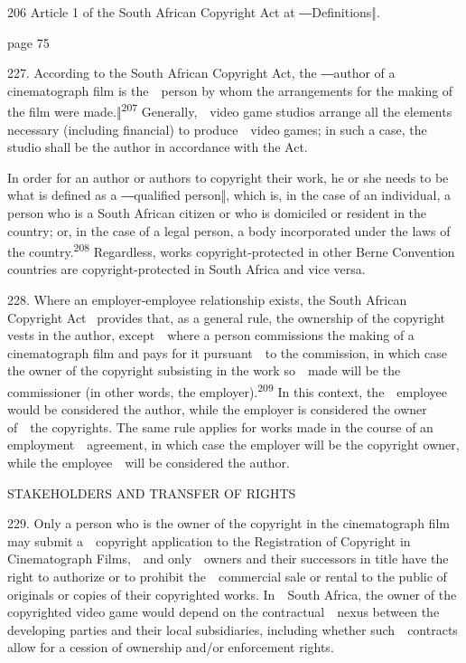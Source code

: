 \documentclass[
]{article}
\begin{document}
{206 }{Article 1 of the South African }{Copyright Act }{at
}{―}{Definitions}{‖}{.}

{page 75}

{227. }{According to the South African }{Copyright Act}{, the ―}{author
of a cinematograph film is the~~person by whom the arrangements }{for
the making of the film were made.‖}\textsuperscript{{207
}}{Generally,~~video game studios arrange all the elements necessary
(including financial) to produce~~video games; in such a case, the
studio shall be the author in accordance with the Act.}

{In order for an author or authors to copyright their work, he or she
needs to be what is }{defined as a ―qualified person‖, which is, in the
case of an individual, a person who is a }{South African citizen or who
is domiciled or resident in the country; or, in the case of a legal
person, a body incorporated under the laws of the
country.}\textsuperscript{{208 }}{Regardless, works copyright-protected
in other Berne Convention countries are copyright-protected in South
Africa and }{vice versa}{.}

{228. }{Where an employer-employee relationship exists, the South
African }{Copyright Act }{~provides that, as a general rule, the
ownership of the copyright vests in the author, except~~where a person
commissions the making of a cinematograph film and pays for it
pursuant~~to the commission, in which case the owner of the copyright
subsisting in the work so~~made will be the commissioner (in other
words, the employer).}\textsuperscript{{209 }}{In this context,
the~~employee would be considered the author, while the employer is
considered the owner of~~the copyrights. The same rule applies for works
made in the course of an employment~~agreement, in which case the
employer will be the copyright owner, while the employee~~will be
considered the author.}

{STAKEHOLDERS AND TRANSFER OF RIGHTS}

{229. }{Only a person who is the owner of the copyright in the
cinematograph film may submit a~~copyright application to the
Registration of Copyright in Cinematograph Films,~~and only~~owners and
their successors in title have the right to authorize or to prohibit
the~~commercial sale or rental to the public of originals or copies of
their copyrighted works. In~~South Africa, the owner of the copyrighted
video game would depend on the contractual~~nexus between the developing
parties and their local subsidiaries, including whether such~~contracts
allow for a cession of ownership and/or enforcement rights.}
\end{document}
